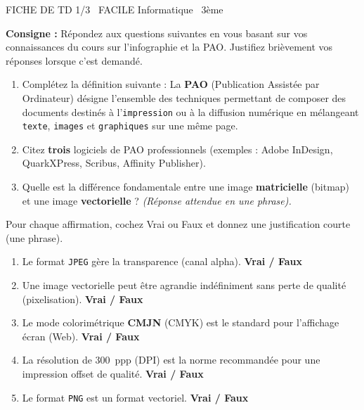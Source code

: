 \documentclass[11pt]{article}
\begin{document}
\begin{tcolorbox}[enhanced,colback=popink,colframe=popink,arc=10pt,boxrule=0pt,left=12pt,right=12pt,top=9pt,bottom=9pt]
{\color{white}\popxbold\small FICHE DE TD 1/3 \textbullet\ FACILE \hfill Informatique \textbullet\ 3ème\par}
\end{tcolorbox}
\vspace{4pt}
\textbf{Consigne :} Répondez aux questions suivantes en vous basant sur vos connaissances du cours sur l'infographie et la PAO. Justifiez brièvement vos réponses lorsque c'est demandé.

\begin{exercice}
\begin{enumerate}
    \item Complétez la définition suivante : La \textbf{PAO} (Publication Assistée par Ordinateur) désigne l'ensemble des techniques permettant de composer des documents destinés à l'\texttt{impression} ou à la diffusion numérique en mélangeant \texttt{texte}, \texttt{images} et \texttt{graphiques} sur une même page.
    \item Citez \textbf{trois} logiciels de PAO professionnels (exemples : Adobe InDesign, QuarkXPress, Scribus, Affinity Publisher).
    \item Quelle est la différence fondamentale entre une image \textbf{matricielle} (bitmap) et une image \textbf{vectorielle} ? \textit{(Réponse attendue en une phrase).}
\end{enumerate}
\end{exercice}

\begin{exercice}
Pour chaque affirmation, cochez Vrai ou Faux et donnez une justification courte (une phrase).
\begin{enumerate}
    \item Le format \texttt{JPEG} gère la transparence (canal alpha). \hfill \textbf{Vrai / Faux}
    \item Une image vectorielle peut être agrandie indéfiniment sans perte de qualité (pixelisation). \hfill \textbf{Vrai / Faux}
    \item Le mode colorimétrique \textbf{CMJN} (CMYK) est le standard pour l'affichage écran (Web). \hfill \textbf{Vrai / Faux}
    \item La résolution de \SI{300}{ppp} (DPI) est la norme recommandée pour une impression offset de qualité. \hfill \textbf{Vrai / Faux}
    \item Le format \texttt{PNG} est un format vectoriel. \hfill \textbf{Vrai / Faux}
\end{enumerate}
\end{exercice}
\end{document}
